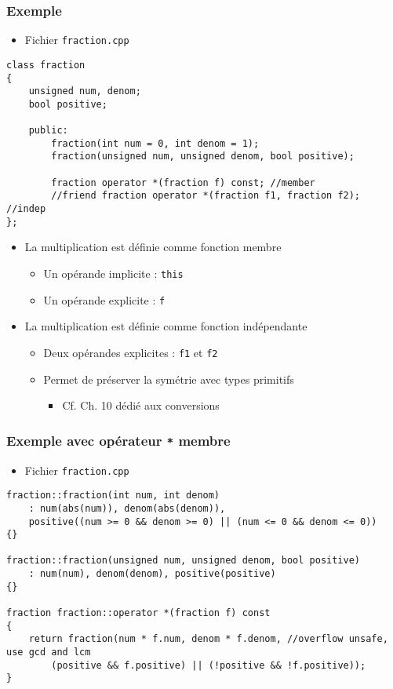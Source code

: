 \begin{frame}[containsverbatim]
\frametitle{Exemple}
\begin{itemize}
\item Fichier \texttt{fraction.cpp}
\end{itemize}
\begin{lstlisting}
class fraction
{
	unsigned num, denom;
	bool positive;

	public:
		fraction(int num = 0, int denom = 1);
		fraction(unsigned num, unsigned denom, bool positive);

		fraction operator *(fraction f) const; //member
		//friend fraction operator *(fraction f1, fraction f2); //indep
};
\end{lstlisting}
\begin{itemize}
\item La multiplication est définie comme fonction membre
	\begin{itemize}
	\item Un opérande implicite : \lstinline|this|
	\item Un opérande explicite : \texttt{f}
	\end{itemize}
\item La multiplication est définie comme fonction indépendante
	\begin{itemize}
	\item Deux opérandes explicites : \texttt{f1} et \texttt{f2}
	\item Permet de préserver la symétrie avec types primitifs
		\begin{itemize}
		\item Cf. Ch. 10 dédié aux conversions
		\end{itemize}
	\end{itemize}
\end{itemize}
\end{frame}

\begin{frame}[containsverbatim]
\frametitle{Exemple avec opérateur \texttt{*} membre}
\begin{itemize}
\item Fichier \texttt{fraction.cpp}
\end{itemize}
\begin{lstlisting}
fraction::fraction(int num, int denom) 
	: num(abs(num)), denom(abs(denom)), 
	positive((num >= 0 && denom >= 0) || (num <= 0 && denom <= 0))
{}

fraction::fraction(unsigned num, unsigned denom, bool positive) 
	: num(num), denom(denom), positive(positive)
{}

fraction fraction::operator *(fraction f) const
{
	return fraction(num * f.num, denom * f.denom, //overflow unsafe, use gcd and lcm
		(positive && f.positive) || (!positive && !f.positive));
}
\end{lstlisting}
\end{frame}

